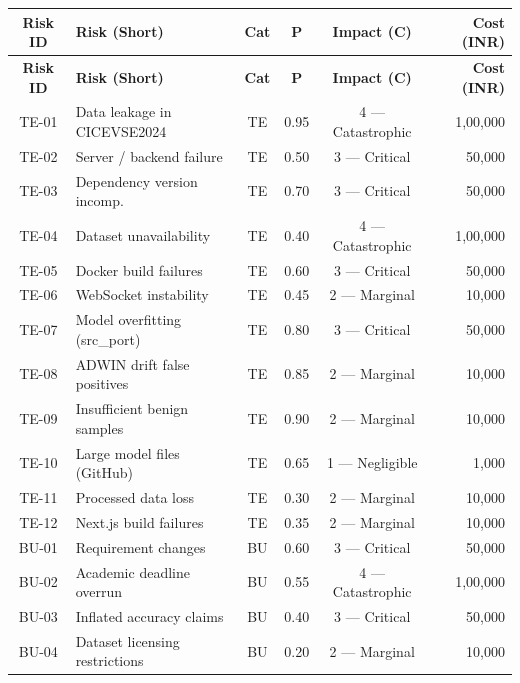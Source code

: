 \documentclass[11pt, a4paper]{article}
\begin{document}
\small
\begin{longtable}{|c|p{4.5cm}|c|c|c|r|}
\hline
\rowcolor{lightgray}
\textbf{Risk ID} & \textbf{Risk (Short)} & \textbf{Cat} & \textbf{P} & \textbf{Impact (C)} & \textbf{Cost (INR)} \\
\hline
\endfirsthead
\hline
\rowcolor{lightgray}
\textbf{Risk ID} & \textbf{Risk (Short)} & \textbf{Cat} & \textbf{P} & \textbf{Impact (C)} & \textbf{Cost (INR)} \\
\hline
\endhead

\rowcolor{red!5}
TE-01 & Data leakage in CICEVSE2024 & TE & 0.95 & 4 --- Catastrophic & 1,00,000 \\
\hline
TE-02 & Server / backend failure & TE & 0.50 & 3 --- Critical & 50,000 \\
\hline
\rowcolor{red!5}
TE-03 & Dependency version incomp. & TE & 0.70 & 3 --- Critical & 50,000 \\
\hline
TE-04 & Dataset unavailability & TE & 0.40 & 4 --- Catastrophic & 1,00,000 \\
\hline
\rowcolor{red!5}
TE-05 & Docker build failures & TE & 0.60 & 3 --- Critical & 50,000 \\
\hline
TE-06 & WebSocket instability & TE & 0.45 & 2 --- Marginal & 10,000 \\
\hline
\rowcolor{red!5}
TE-07 & Model overfitting (src\_port) & TE & 0.80 & 3 --- Critical & 50,000 \\
\hline
TE-08 & ADWIN drift false positives & TE & 0.85 & 2 --- Marginal & 10,000 \\
\hline
\rowcolor{red!5}
TE-09 & Insufficient benign samples & TE & 0.90 & 2 --- Marginal & 10,000 \\
\hline
TE-10 & Large model files (GitHub) & TE & 0.65 & 1 --- Negligible & 1,000 \\
\hline
TE-11 & Processed data loss & TE & 0.30 & 2 --- Marginal & 10,000 \\
\hline
TE-12 & Next.js build failures & TE & 0.35 & 2 --- Marginal & 10,000 \\
\hline
\rowcolor{orange!5}
BU-01 & Requirement changes & BU & 0.60 & 3 --- Critical & 50,000 \\
\hline
\rowcolor{orange!5}
BU-02 & Academic deadline overrun & BU & 0.55 & 4 --- Catastrophic & 1,00,000 \\
\hline
BU-03 & Inflated accuracy claims & BU & 0.40 & 3 --- Critical & 50,000 \\
\hline
BU-04 & Dataset licensing restrictions & BU & 0.20 & 2 --- Marginal & 10,000 \\

\end{longtable}
\end{document}
